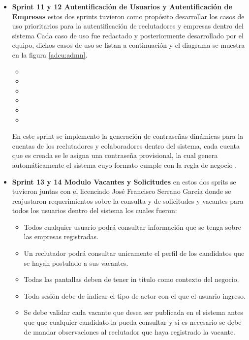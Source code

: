 \begin{itemize}
    \item \textbf{Sprint 11 y 12 Autentificación de Usuarios y Autentificación de Empresas} estos dos sprints tuvieron como propósito desarrollar los casos de uso prioritarios para la autentificación de reclutadores y empresas dentro del sistema
    Cada caso de uso fue redactado y posteriormente desarrollado por el equipo, dichos casos de uso se listan a continuación y el diagrama se muestra en la figura \ref{adcu:admn}.
    \begin{itemize}
        \item {}
        \item {}
        \item {}
        \item {}
        \item {}
        \item {}
    \end{itemize} 
    En este sprint se implemento la generación de contraseñas dinámicas para la cuentas de los reclutadores y colaboradores dentro del sistema, cada cuenta que es creada se le asigna una contraseña provisional, la cual genera automáticamente el sistema cuyo formato cumple con la regla de negocio .
    

    \item \textbf{Sprint 13 y 14 Modulo Vacantes y Solicitudes} en estos dos sprits se tuvieron juntas con el licenciado José Francisco Serrano García donde se reajustaron requerimientos sobre la consulta y de solicitudes y vacantes para todos los 
    usuarios dentro del sistema los cuales fueron:
    \begin{itemize}
        \item Todos cualquier usuario podrá consultar información que se tenga sobre las empresas registradas.
        \item Un reclutador podrá consultar unicamente el perfil de los candidatos que se hayan postulado a sus vacantes.
        \item Todas las pantallas deben de tener in titulo como contexto del negocio.
        \item Toda sesión debe de indicar el tipo de actor con el que el usuario ingreso.
        \item Se debe validar cada vacante que desea ser publicada en el sistema antes que que cualquier candidato la pueda consultar y si es necesario se debe de mandar observaciones al reclutador que haya registrado la vacante.
    \end{itemize} 


\end{itemize}
